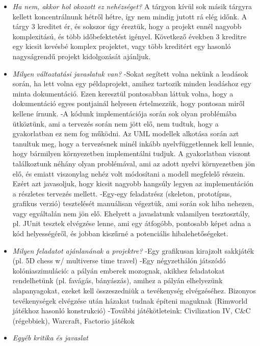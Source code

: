 \begin{itemize}
\item \textit{Ha nem, akkor hol okozott ez nehézséget?} \newline
    A tárgyon kívül sok másik tárgyra kellett koncentrálnunk hétről hétre, így nem mindig jutott rá elég időnk. A tárgy 3 kreditet ér, és sokszor úgy éreztük, hogy a projekt ennél nagyobb komplexitású, és több időbefektetést igényel. Következő években 3 kreditre egy kicsit kevésbé komplex projektet, vagy több kreditért egy hasonló nagyságrendű projekt kidolgozását ajánljuk. 
\item \textit{Milyen változtatási javaslatuk van?} \newline
    -Sokat segített volna nekünk a leadások során, ha lett volna egy példaprojekt, amihez tartozik minden leadáshoz egy minta dokumentáció. Ezen keresztül pontosabban láttuk volna, hogy a dokumentáció egyes pontjainál helyesen értelmezzük, hogy pontosan miről kellene írnunk. 
    -A kódunk implementációja során sok olyan problémába ütköztünk, ami a tervezés során nem jött elő, nem tudtuk, hogy a gyakorlatban ez nem fog működni. Az UML modellek alkotása során azt tanultuk meg, hogy a tervezésnek minél inkább nyelvfüggetlennek kell lennie, hogy bármilyen környezetben implementálni tudjuk. A gyakorlatban viszont találkoztunk néhány olyan problémával, ami az adott nyelvi környezetben jön elő, és emiatt viszonylag nehéz volt módosítani a modell megfelelő részein. Ezért azt javasoljuk, hogy kicsit nagyobb hangsúly legyen az implementáción a részletes tervezés mellett. 
    -Egy-egy feladatrész (skeleton, prototípus, grafikus verzió) tesztelését manuálisan végeztük, ami során sok hiba nehezen, vagy egyáltalán nem jön elő. Ehelyett a javaslatunk valamilyen tesztosztály, pl. JUnit tesztek elvégzése lenne, ami egy átfogóbb, pontosabb képet adna a kód helyességéről, és jobban kiszűrné a potenciális hibalehetőségeket. 
\item \textit{Milyen feladatot ajánlanának a projektre?} \newline
    -Egy grafikusan kirajzolt sakkjáték (pl. 5D chess w/ multiverse time travel)
    -Egy négyzethálón játszódó kolóniaszimuláció: a pályán emberek mozognak, akikhez feladatokat rendelhetünk (pl. favágás, bányászás), amihez a pályán elhelyezünk alapanyagokat, ezeket kell összeszedniük a tevékenység elvégzéséhez. Bizonyos tevékenységek elvégzése után házakat tudnak építeni maguknak (Rimworld játékhoz hasonló konstrukció)
    -További játékötleteink: Civilization IV, C&C (régebbiek), Warcraft, Factorio játékok  
\item \textit{Egyéb kritika és javaslat} \newline

\end{itemize}
